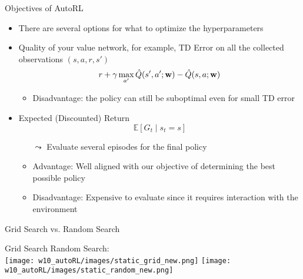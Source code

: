 \documentclass[aspectratio=169]{../latex_main/tntbeamer}  %
\begin{document}
\begin{frame}[c]{Objectives of AutoRL}

	\begin{itemize}
            \item There are several options for what to optimize the hyperparameters
            \item Quality of your value network, for example, TD Error on all the collected observations $(s, a, r, s')$ 
               $$ r + \gamma \max_{a'} \hat{Q}(s',a';\mathbf{w}) - \hat{Q}(s,a;\mathbf{w})$$
            \begin{itemize}
                \item Disadvantage: the policy can still be suboptimal even for small TD error
            \end{itemize}
            \smallskip
            \pause
            \item Expected (Discounted) Return
            $$\mathbb{E}[G_t \mid s_t=s]$$
            \begin{itemize}
                \item[$\leadsto$] Evaluate several episodes for the final policy
                \item Advantage: Well aligned with our objective of determining the best possible policy
                \item Disadvantage: Expensive to evaluate since it requires interaction with the environment
            \end{itemize}
        \end{itemize}
	
\end{frame}
\begin{frame}[c]{Grid Search vs. Random Search}
	
\centering
Grid Search \hspace{10em} Random Search:\\
\texttt{[image: w10\_autoRL/images/static\_grid\_new.png]}
\texttt{[image: w10\_autoRL/images/static\_random\_new.png]}

\end{frame}
\end{document}
